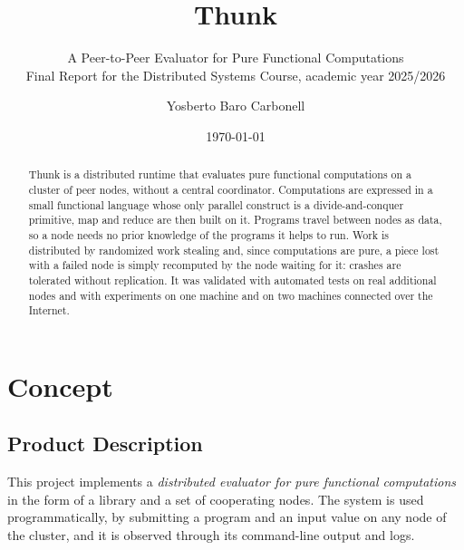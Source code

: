 \documentclass{scrartcl}
\title{\LARGE Thunk}
\subtitle{A Peer-to-Peer Evaluator for Pure Functional Computations\\
Final Report for the Distributed Systems Course, academic year 2025/2026}
\author{
    Yosberto Baro Carbonell \\ \emailaddr{yosberto.baro@studio.unibo.it}
}
\date{\today}
\begin{document}
\maketitle

\begin{abstract}
Thunk is a distributed runtime that evaluates pure functional computations on a cluster of peer nodes, without a central coordinator.
%
Computations are expressed in a small functional language whose only parallel construct is a divide-and-conquer primitive, map and reduce are then built on it.
%
Programs travel between nodes as data, so a node needs no prior knowledge of the programs it helps to run.
%
Work is distributed by randomized work stealing and, since computations are pure, a piece lost with a failed node is simply recomputed by the node waiting for it: crashes are tolerated without replication.
%
It was validated with automated tests on real additional nodes and with experiments on one machine and on two machines connected over the Internet.
\end{abstract}

%
%

\section{Concept}\label{concept}

\subsection{Product Description}

This project implements a \emph{distributed evaluator for pure functional computations} in the form of a library and a set of cooperating nodes.
%
The system is used programmatically, by submitting a program and an input value on any node of the cluster, and it is observed through its command-line output and logs.
\end{document}
